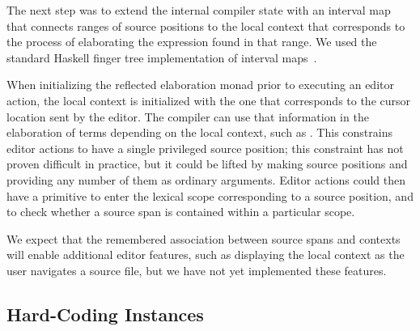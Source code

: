 The next step was to extend the internal compiler state with an
interval map that connects ranges of source positions to the local
context that corresponds to the process of elaborating the expression
found in that range. We used the standard Haskell finger tree
implementation of interval maps~\cite{fingertrees}.

When initializing the reflected elaboration monad prior to executing
an editor action, the local context is initialized with the one that
corresponds to the cursor location sent by the editor. The compiler
can use that information in the elaboration of terms depending on the
local context, such as . This constrains
editor actions to have a single privileged source position; this
constraint has not proven difficult in practice, but it could be
lifted by making source positions  and providing any
number of them as ordinary arguments. Editor actions could then have a
primitive to enter the lexical scope corresponding to a source
position, and to check whether a source span is contained within a
particular scope.

We expect that the remembered association between source spans and
contexts will enable additional editor features, such as displaying
the local context as the user navigates a source file, but we have not
yet implemented these features.

\subsection{Hard-Coding \Editorable{} Instances}
\label{ssec:hardcodingEditorable}

